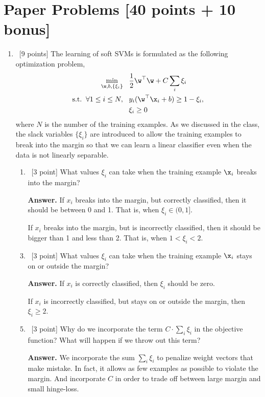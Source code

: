 \documentclass[12pt, fullpage,letterpaper]{article}
\begin{document}
\section{Paper Problems [40 points + 10 bonus]}
\begin{enumerate}

	\item~[9 points] The learning of soft SVMs is formulated as the following optimization problem,
		\begin{align}
		\min\limits_{\w, b, \{\xi_i\}} &\;\;\;\frac{1}{2}\w^\top\w + C\sum_i \xi_i 
		\nonumber\\
		\mathrm{s.t.}\;\; \forall 1 \le i \le N,&\;\;\; y_i(\w^\top \x_i + b) \ge 1 - \xi_i , \nonumber \\
		&\;\;\; \xi_i \ge 0 \nonumber
		\end{align}
		where $N$ is the number of the training examples.
	As we discussed in the class, the slack variables $\{\xi_i\}$ are introduced to allow the training examples to break into the margin so that we can learn a linear classifier even when the data is not linearly separable. 
	\begin{enumerate}
		\item~[3 point] What values $\xi_i$ can take when the training example $\x_i$ breaks into the margin? 

\item[{\bf Answer.}] If $x_i$ breaks into the margin, but correctly classified, then it should be between 0 and 1. That is, when $\xi_i \in (0,1]$. 

If $x_i$ breaks into the margin, but is incorrectly classified, then it should be bigger than 1 and less than 2. That is, when $1<\xi_i <2$. 

		\item~[3 point] What values $\xi_i$ can take when the training example $\x_i$ stays on or outside the margin? 
		
\item[{\bf Answer.}] If $x_i$ is correctly classified, then $\xi_i$ should be zero. 

If $x_i$ is incorrectly classified, but stays on or outside the margin, then $\xi_i \geq 2$. 



		\item~[3 point] Why do we incorporate the term $C\cdot\sum_i \xi_i $ in the objective function? What will happen if we throw out this term? 
		
\item[{\bf Answer.}] We incorporate the sum $\sum_i \xi_i $ to penalize weight vectors that make mistake. In fact, it allows as few examples as possible to violate the margin. And incorporate $C$ in order to trade off between large margin and small hinge-loss. 


\end{enumerate}
\end{enumerate}
\end{document}
